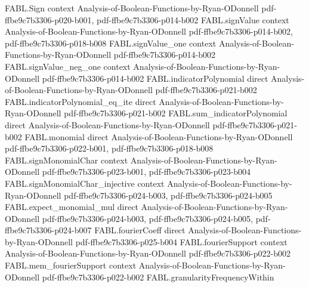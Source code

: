 \begin{theorem}
\label{FABL.variance_eq_four_mul_probabilities}
\leanok
{}
\proofstep
  {FABL.Sign}
  {context}
  {Analysis-of-Boolean-Functions-by-Ryan-ODonnell}
  {pdf-ffbe9c7b3306-p020-b001,
    pdf-ffbe9c7b3306-p014-b002}
\proofstep
  {FABL.signValue}
  {context}
  {Analysis-of-Boolean-Functions-by-Ryan-ODonnell}
  {pdf-ffbe9c7b3306-p014-b002,
    pdf-ffbe9c7b3306-p018-b008}
\proofstep
  {FABL.signValue_one}
  {context}
  {Analysis-of-Boolean-Functions-by-Ryan-ODonnell}
  {pdf-ffbe9c7b3306-p014-b002}
\proofstep
  {FABL.signValue_neg_one}
  {context}
  {Analysis-of-Boolean-Functions-by-Ryan-ODonnell}
  {pdf-ffbe9c7b3306-p014-b002}
\proofstep
  {FABL.indicatorPolynomial}
  {direct}
  {Analysis-of-Boolean-Functions-by-Ryan-ODonnell}
  {pdf-ffbe9c7b3306-p021-b002}
\proofstep
  {FABL.indicatorPolynomial_eq_ite}
  {direct}
  {Analysis-of-Boolean-Functions-by-Ryan-ODonnell}
  {pdf-ffbe9c7b3306-p021-b002}
\proofstep
  {FABL.sum_indicatorPolynomial}
  {direct}
  {Analysis-of-Boolean-Functions-by-Ryan-ODonnell}
  {pdf-ffbe9c7b3306-p021-b002}
\proofstep
  {FABL.monomial}
  {direct}
  {Analysis-of-Boolean-Functions-by-Ryan-ODonnell}
  {pdf-ffbe9c7b3306-p022-b001,
    pdf-ffbe9c7b3306-p018-b008}
\proofstep
  {FABL.signMonomialChar}
  {context}
  {Analysis-of-Boolean-Functions-by-Ryan-ODonnell}
  {pdf-ffbe9c7b3306-p023-b001,
    pdf-ffbe9c7b3306-p023-b004}
\proofstep
  {FABL.signMonomialChar_injective}
  {context}
  {Analysis-of-Boolean-Functions-by-Ryan-ODonnell}
  {pdf-ffbe9c7b3306-p024-b003,
    pdf-ffbe9c7b3306-p024-b005}
\proofstep
  {FABL.expect_monomial_mul}
  {direct}
  {Analysis-of-Boolean-Functions-by-Ryan-ODonnell}
  {pdf-ffbe9c7b3306-p024-b003,
    pdf-ffbe9c7b3306-p024-b005,
    pdf-ffbe9c7b3306-p024-b007}
\proofstep
  {FABL.fourierCoeff}
  {direct}
  {Analysis-of-Boolean-Functions-by-Ryan-ODonnell}
  {pdf-ffbe9c7b3306-p025-b004}
\proofstep
  {FABL.fourierSupport}
  {context}
  {Analysis-of-Boolean-Functions-by-Ryan-ODonnell}
  {pdf-ffbe9c7b3306-p022-b002}
\proofstep
  {FABL.mem_fourierSupport}
  {context}
  {Analysis-of-Boolean-Functions-by-Ryan-ODonnell}
  {pdf-ffbe9c7b3306-p022-b002}
\proofstep
  {FABL.granularityFrequencyWithin}

\end{theorem}
